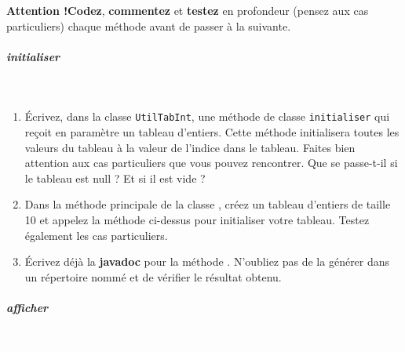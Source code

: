 \documentclass[11pt,a4paper]{article}
\begin{document}
            \par
        \textbf{Attention !}\textbf{Codez}, \textbf{commentez} 
					et \textbf{testez} en profondeur
					(pensez aux cas particuliers)
					chaque m\'ethode avant de passer \`a la suivante.
				
            \par
        
			
		\subparagraph{initialiser} 
		
					\textcolor{white}{.} \par
				
            \par
        
					\begin{enumerate}
				
			\item  
					\'Ecrivez, dans la classe 
					\verb|UtilTabInt|, 
					une m\'ethode de classe 
					\verb|initialiser|    
					qui re\c coit en param\`etre un tableau d'entiers. 
					Cette m\'ethode initialisera toutes les valeurs 
					du tableau \`a la valeur de l'indice dans le tableau.
					Faites bien attention
					aux cas particuliers que vous pouvez rencontrer. 
					Que se passe-t-il si le tableau est null ? 
					Et si il est vide ?
				
			\item  
					Dans la m\'ethode principale de la classe 
					\verb@Test@, 
					cr\'eez un tableau d'entiers de taille 10
					et appelez la m\'ethode 
					\verb@initialiser@ 
					ci-dessus pour initialiser votre tableau.
					Testez \'egalement les cas particuliers.
				
			\item  
					\'Ecrivez d\'ej\`a la 
					\textbf{javadoc} 
					pour la m\'ethode 
					\verb@initialiser@.
					N'oubliez pas de la g\'en\'erer dans un r\'epertoire 
					nomm\'e \verb@javadoc@ 
					et de v\'erifier le r\'esultat obtenu.
				
					\end{enumerate}
				
			
		\subparagraph{afficher} 
		
					\textcolor{white}{.} \par
				
            \par
        
\end{document}
